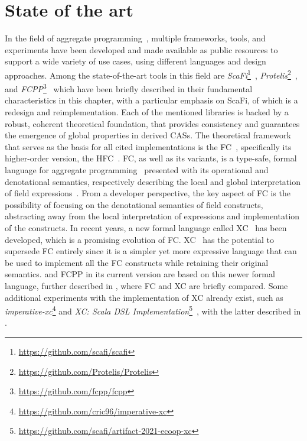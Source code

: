 \chapter{State of the art}
\label{chap:state-of-the-art}

In the field of aggregate programming~\cite{aggregate-programming}, multiple frameworks, tools, and experiments have been developed and made available as public resources to support a wide variety of use cases, using different languages and design approaches.
%
Among the state-of-the-art tools in this field are \textit{ScaFi}\footnote{\url{https://github.com/scafi/scafi}}~\cite{scafi}, \textit{Protelis}\footnote{\url{https://github.com/Protelis/Protelis}}~\cite{protelis}, and \textit{FCPP}\footnote{\url{https://github.com/fcpp/fcpp}}~\cite{fcpp} which have been briefly described in their fundamental characteristics in this chapter, with a particular emphasis on ScaFi, of which \this is a redesign and reimplementation.
%
Each of the mentioned libraries is backed by a robust, coherent theoretical foundation, that provides consistency and guarantees the emergence of global properties in derived \acp{CAS}.
%
The theoretical framework that serves as the basis for all cited implementations is the \ac{FC}~\cite{fc}, specifically its higher-order version, the \ac{HFC}~\cite{hofc}.
%
\ac{FC}, as well as its variants, is a type-safe, formal language for aggregate programming~\cite{fc, from-dc-to-fc-and-ap} presented with its operational and denotational semantics, respectively describing the local and global interpretation of field expressions~\cite{from-dc-to-fc-and-ap}.
%
From a developer perspective, the key aspect of \ac{FC} is the possibility of focusing on the denotational semantics of field constructs, abstracting away from the local interpretation of expressions and implementation of the constructs.
%
In recent years, a new formal language called \ac{XC}~\cite{xc} has been developed, which is a promising evolution of \ac{FC}.
%
\ac{XC}~\cite{xc} has the potential to supersede \ac{FC} entirely since it is a simpler yet more expressive language that can be used to implement all the \ac{FC} constructs while retaining their original semantics.
%
\this and FCPP in its current version are based on this newer formal language, further described in , where \ac{FC} and \ac{XC} are briefly compared.
%
Some additional experiments with the implementation of \ac{XC} already exist, such as \textit{imperative-xc}\footnote{\url{https://github.com/cric96/imperative-xc}} and \textit{XC: Scala DSL Implementation}\footnote{\url{https://github.com/scafi/artifact-2021-ecoop-xc}}~\cite{xc-experiment-with-scafi}, with the latter described in .

